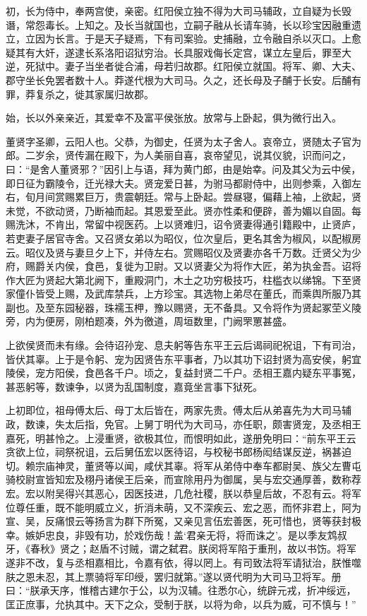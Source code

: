 \documentclass[]{article}
\begin{document}
初，长为侍中，奉两宫使，亲密。红阳侯立独不得为大司马辅政，立自疑为长毁谮，常怨毒长。上知之。及长当就国也，立嗣子融从长请车骑，长以珍宝因融重遗立，立因为长言。于是天子疑焉，下有司案验。史捕融，立令融自杀以灭口。上愈疑其有大奸，遂逮长系洛阳诏狱穷治。长具服戏侮长定宫，谋立左皇后，罪至大逆，死狱中。妻子当坐者徙合浦，母若归故郡。红阳侯立就国。将军、卿、大夫、郡守坐长免罢者数十人。莽遂代根为大司马。久之，还长母及子酺于长安。后酺有罪，莽复杀之，徙其家属归故郡。

始，长以外亲亲近，其爱幸不及富平侯张放。放常与上卧起，俱为微行出入。

董贤字圣卿，云阳人也。父恭，为御史，任贤为太子舍人。哀帝立，贤随太子官为郎。二岁余，贤传漏在殿下，为人美丽自喜，哀帝望见，说其仪貌，识而问之，曰：``是舍人董贤邪？''因引上与语，拜为黄门郎，由是始幸。问及其父为云中侯，即日征为霸陵令，迁光禄大夫。贤宠爱日甚，为驸马都尉侍中，出则参乘，入御左右，旬月间赏赐累巨万，贵震朝廷。常与上卧起。尝昼寝，偏藉上袖，上欲起，贤未觉，不欲动贤，乃断袖而起。其恩爱至此。贤亦性柔和便辟，善为媚以自固。每赐洗沐，不肯出，常留中视医药。上以贤难归，诏令贤妻得通引籍殿中，止贤庐，若吏妻子居官寺舍。又召贤女弟以为昭仪，位次皇后，更名其舍为椒风，以配椒房云。昭仪及贤与妻旦夕上下，并侍左右。赏赐昭仪及贤妻亦各千万数。迁贤父为少府，赐爵关内侯，食邑，复徙为卫尉。又以贤妻父为将作大匠，弟为执金吾。诏将作大匠为贤起大第北阙下，重殿洞门，木土之功穷极技巧，柱槛衣以绨锦。下至贤家僮仆皆受上赐，及武库禁兵，上方珍宝。其选物上弟尽在董氏，而乘舆所服乃其副也。及至东园秘器，珠襦玉柙，豫以赐贤，无不备具。又令将作为贤起冢茔义陵旁，内为便房，刚柏题凑，外为徼道，周垣数里，门阙罘罳甚盛。

上欲侯贤而未有缘。会待诏孙宠、息夫躬等告东平王云后谒祠祀祝诅，下有司治，皆伏其辜。上于是令躬、宠为因贤告东平事者，乃以其功下诏封贤为高安侯，躬宜陵侯，宠方阳侯，食邑各千户。顷之，复益封贤二千户。丞相王嘉内疑东平事冤，甚恶躬等，数谏争，以贤为乱国制度，嘉竟坐言事下狱死。

上初即位，祖母傅太后、母丁太后皆在，两家先贵。傅太后从弟喜先为大司马辅政，数谏，失太后指，免官。上舅丁明代为大司马，亦任职，颇害贤宠，及丞相王嘉死，明甚怜之。上浸重贤，欲极其位，而恨明如此，遂册免明曰：``前东平王云贪欲上位，祠祭祝诅，云后舅伍宏以医待诏，与校秘书郎杨闳结谋反逆，祸甚迫切。赖宗庙神灵，董贤等以闻，咸伏其辜。将军从弟侍中奉车都尉吴、族父左曹屯骑校尉宣皆知宏及栩丹诸侯王后亲，而宣除用丹为御属，吴与宏交通厚善，数称荐宏。宏以附吴得兴其恶心，因医技进，几危社稷，朕以恭皇后故，不忍有云。将军位尊任重，既不能明威立义，折消未萌，又不深疾云、宏之恶，而怀非君上，阿为宣、吴，反痛恨云等扬言为群下所冤，又亲见言伍宏善医，死可惜也，贤等获封极幸。嫉妒忠良，非毁有功，於戏伤哉！盖`君亲无将，将而诛之'。是以季友鸩叔牙，《春秋》贤之；赵盾不讨贼，谓之弑君。朕闵将军陷于重刑，故以书饬。将军遂非不改，复与丞相嘉相比，令嘉有依，得以罔上。有司致法将军请狱治，朕惟噬肤之恩未忍，其上票骑将军印绶，罢归就第。''遂以贤代明为大司马卫将军。册曰：``朕承天序，惟稽古建尔于公，以为汉辅。往悉尔心，统辟元戎，折冲绥远，匡正庶事，允执其中。天下之众，受制于朕，以将为命，以兵为威，可不慎与！''
\end{document}
